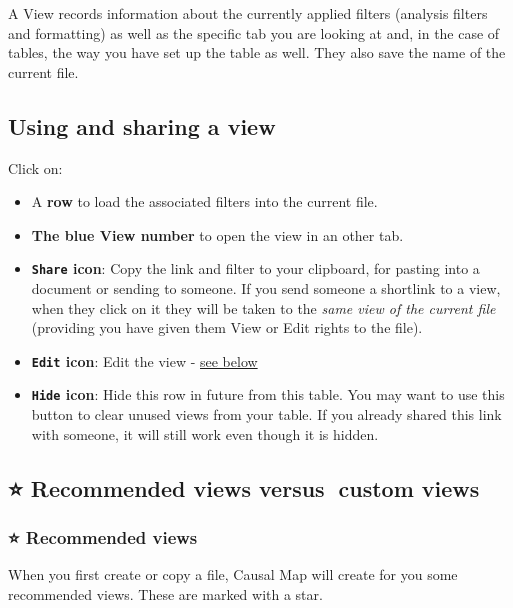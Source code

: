 \documentclass[
]{book}
\providecommand{\tightlist}{%
  \setlength{\itemsep}{0pt}\setlength{\parskip}{0pt}}
\begin{document}
A View records information about the currently applied filters (analysis filters and formatting) as well as the specific tab you are looking at and, in the case of tables, the way you have set up the table as well. They also save the name of the current file.

\hypertarget{xsharing_view}{%
\subsection{Using and sharing a view}\label{xsharing_view}}

Click on:

\begin{itemize}
\tightlist
\item
  A \textbf{row} to load the associated filters into the current file.
\item
  \textbf{The blue View number} to open the view in an other tab.
\item
  \textbf{\texttt{Share} icon}: Copy the link and filter to your clipboard, for pasting into a document or sending to someone. If you send someone a shortlink to a view, when they click on it they will be taken to the \emph{same view of the current file} (providing you have given them View or Edit rights to the file).
\item
  \textbf{\texttt{Edit} icon}: Edit the view - \protect\hyperlink{xedit_view}{see below}
\item
  \textbf{\texttt{Hide} icon}: Hide this row in future from this table. You may want to use this button to clear unused views from your table. If you already shared this link with someone, it will still work even though it is hidden.
\end{itemize}

\hypertarget{recommended-views-versus-custom-views}{%
\subsection{⭐ Recommended views versus 🤵custom views}\label{recommended-views-versus-custom-views}}

\hypertarget{recommended-views}{%
\subsubsection{⭐ Recommended views}\label{recommended-views}}

When you first create or copy a file, Causal Map will create for you some recommended views. These are marked with a star.
\end{document}
